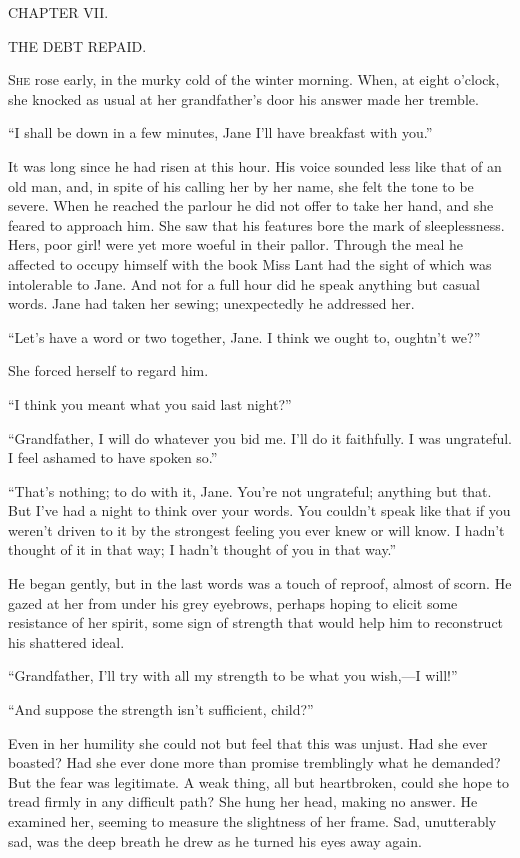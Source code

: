 {}

{CHAPTER VII.}

THE DEBT REPAID.

\textsc{She} rose early, in the murky cold of the winter morning. When,
at eight o'clock, she knocked as usual at her grandfather's door his
answer made her tremble.

``I shall be down in a few minutes, Jane I'll have breakfast with you.''

It was long since he had risen at this hour. His voice sounded less like
that of an old man, and, in spite of his calling her by her name, she
felt the tone to be severe. When he reached the parlour he did not offer
to take her hand, and she feared to approach him. She saw that his
features bore the mark of sleeplessness. Hers, poor girl! were yet more
woeful in their pallor. Through the meal he affected to occupy himself
with the book Miss Lant had {}the sight of which was intolerable to
Jane. And not for a full hour did he speak anything but casual words.
Jane had taken her sewing; unexpectedly he addressed her.

``Let's have a word or two together, Jane. I think we ought to, oughtn't
we?''

She forced herself to regard him.

``I think you meant what you said last night?''

``Grandfather, I will do whatever you bid me. I'll do it faithfully. I
was ungrateful. I feel ashamed to have spoken so.''

``That's nothing; to do with it, Jane. You're not ungrateful; anything
but that. But I've had a night to think over your words. You couldn't
speak like that if you weren't driven to it by the strongest feeling you
ever knew or will know. I hadn't thought of it in that way; I hadn't
thought of you in that way.''

He began gently, but in the last words was a touch of reproof, almost of
scorn. He gazed at her from under his grey eyebrows, perhaps hoping to
elicit some resistance of her spirit, some sign of strength that would
help him to reconstruct his shattered ideal.

{}``Grandfather, I'll try with all my strength to be what you wish,---I
will!''

``And suppose the strength isn't sufficient, child?''

Even in her humility she could not but feel that this was unjust. Had
she ever boasted? Had she ever done more than promise tremblingly what
he demanded? But the fear was legitimate. A weak thing, all but
heartbroken, could she hope to tread firmly in any difficult path? She
hung her head, making no answer. He examined her, seeming to measure the
slightness of her frame. Sad, unutterably sad, was the deep breath he
drew as he turned his eyes away again.

